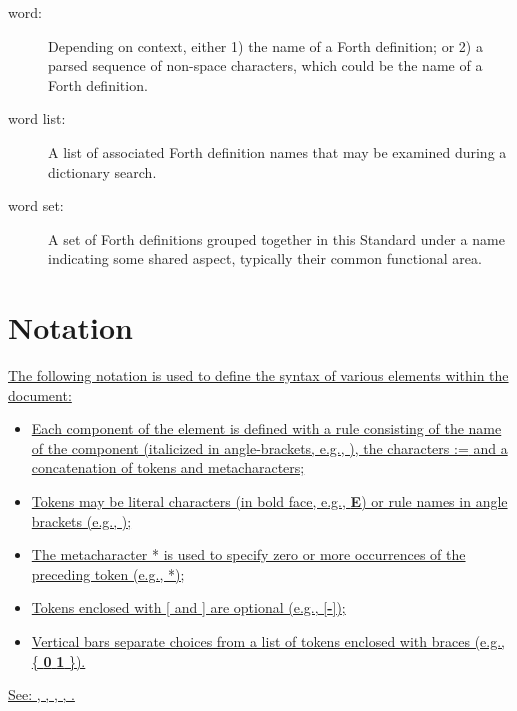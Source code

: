 \begin{description}
\item[word:]
	Depending on context, either
	1) the name of a Forth definition; or
	2) a parsed sequence of non-space characters,
	which could be the name of a Forth definition.

\item[word list:]
	A list of associated Forth definition names that may be examined
	during a dictionary search.

\item[word set:]
	A set of Forth definitions grouped together in this Standard
	under a name indicating some shared aspect, typically their
	common functional area.
\end{description}

\section{Notation} %
\label{notations}

\cbstart{}
\uline{The following notation is used to define the syntax of various
elements within the document:}

\begin{itemize}
\item \uline{Each component of the element is defined with a rule consisting
	of the name of the component (italicized in angle-brackets,
	e.g., ), the characters \textsf{:=} and a concatenation
	of tokens and metacharacters;}

\item \uline{Tokens may be literal characters (in bold face, e.g.,
	\textbf{E}) or rule names in angle brackets (e.g.,
	\linebreak {});}

\item \uline{The metacharacter * is used to specify zero or more occurrences of
	the preceding token (e.g., *);}

\item \uline{Tokens enclosed with [ and ] are optional (e.g., [\textbf{-}]);}

\item \uline{Vertical bars separate choices from a list of tokens enclosed
	with braces (e.g., \{ \textbf{0} {\textbar} \textbf{1} \}).}
\end{itemize}

\uline{See: ,
	, \linebreak
	,
	,
	.}
\cbend

